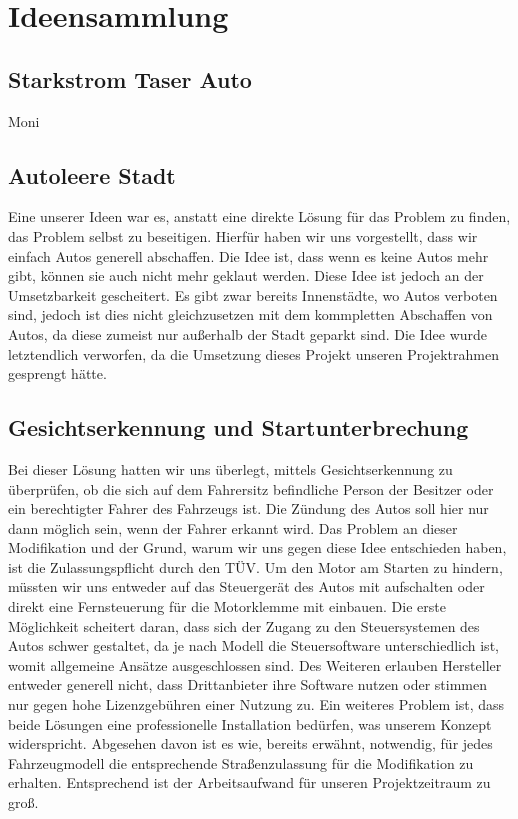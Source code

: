 \section{Ideensammlung}
\subsection{Starkstrom Taser Auto} Moni
\subsection{Autoleere Stadt}
Eine unserer Ideen war es, anstatt eine direkte Lösung für das Problem zu finden, das Problem selbst zu beseitigen. Hierfür haben wir uns vorgestellt, dass wir einfach Autos generell abschaffen. Die Idee ist, dass wenn es keine Autos mehr gibt, können sie auch nicht mehr geklaut werden. Diese Idee ist jedoch an der Umsetzbarkeit gescheitert. Es gibt zwar bereits Innenstädte, wo Autos verboten sind, jedoch ist dies nicht gleichzusetzen mit dem kommpletten Abschaffen von Autos, da diese zumeist nur außerhalb der Stadt geparkt sind. Die Idee wurde letztendlich verworfen, da die Umsetzung dieses Projekt unseren Projektrahmen gesprengt hätte. 
\subsection{Gesichtserkennung und Startunterbrechung}
Bei dieser Lösung hatten wir uns überlegt, mittels Gesichtserkennung zu überprüfen, ob die sich auf dem Fahrersitz befindliche Person der Besitzer oder ein berechtigter Fahrer des Fahrzeugs ist. Die Zündung des Autos soll hier nur dann möglich sein, wenn der Fahrer erkannt wird. Das Problem an dieser Modifikation und der Grund, warum wir uns gegen diese Idee entschieden haben, ist die Zulassungspflicht durch den TÜV. Um den Motor am Starten zu hindern, müssten wir uns entweder auf das Steuergerät des Autos mit aufschalten oder direkt eine Fernsteuerung für die Motorklemme mit einbauen. Die erste Möglichkeit scheitert daran, dass sich der Zugang zu den Steuersystemen des Autos schwer gestaltet, da je nach Modell die Steuersoftware unterschiedlich ist, womit allgemeine Ansätze ausgeschlossen sind. Des Weiteren erlauben Hersteller entweder generell nicht, dass Drittanbieter ihre Software nutzen oder stimmen nur gegen hohe Lizenzgebühren einer Nutzung zu. Ein weiteres Problem ist, dass beide Lösungen eine professionelle Installation bedürfen, was unserem Konzept widerspricht. Abgesehen davon ist es wie, bereits erwähnt, notwendig, für jedes Fahrzeugmodell die entsprechende Straßenzulassung für die Modifikation zu erhalten. Entsprechend ist der Arbeitsaufwand für unseren Projektzeitraum zu groß. 